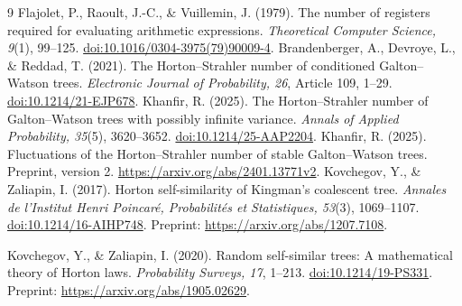 \documentclass[11pt,a4paper]{article}
\theoremstyle{remark}\newtheorem{remark}[theorem]{Remark}
\begin{document}
\begin{thebibliography}{9}
 Flajolet, P., Raoult, J.-C., \& Vuillemin, J. (1979).
The number of registers required for evaluating arithmetic expressions.
\emph{Theoretical Computer Science, 9}(1), 99--125.
\href{https://doi.org/10.1016/0304-3975(79)90009-4}{doi:10.1016/0304-3975(79)90009-4}.
 Brandenberger, A., Devroye, L., \& Reddad, T. (2021).
The Horton--Strahler number of conditioned Galton--Watson trees.
\emph{Electronic Journal of Probability, 26}, Article 109, 1--29.
\href{https://doi.org/10.1214/21-EJP678}{doi:10.1214/21-EJP678}.
 Khanfir, R. (2025).
The Horton--Strahler number of Galton--Watson trees with possibly infinite variance.
\emph{Annals of Applied Probability, 35}(5), 3620--3652.
\href{https://doi.org/10.1214/25-AAP2204}{doi:10.1214/25-AAP2204}.
 Khanfir, R. (2025).
Fluctuations of the Horton--Strahler number of stable Galton--Watson trees.
Preprint, version 2. \url{https://arxiv.org/abs/2401.13771v2}.
Kovchegov, Y., \& Zaliapin, I. (2017).
Horton self-similarity of Kingman's coalescent tree.
\emph{Annales de l'Institut Henri Poincar\'e, Probabilit\'es et Statistiques, 53}(3), 1069--1107.
\href{https://doi.org/10.1214/16-AIHP748}{doi:10.1214/16-AIHP748}.
Preprint: \url{https://arxiv.org/abs/1207.7108}.

Kovchegov, Y., \& Zaliapin, I. (2020).
Random self-similar trees: A mathematical theory of Horton laws.
\emph{Probability Surveys, 17}, 1--213.
\href{https://doi.org/10.1214/19-PS331}{doi:10.1214/19-PS331}.
Preprint: \url{https://arxiv.org/abs/1905.02629}.
\end{thebibliography}
\end{document}

